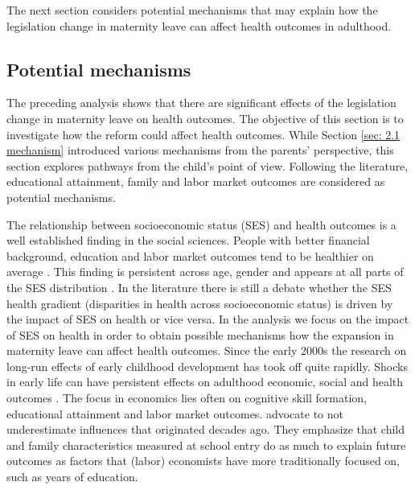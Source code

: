 \documentclass[a4paper ]{article}
\begin{document}
 The next section considers potential mechanisms that may explain how the legislation change in maternity leave can affect health outcomes in adulthood.


\newpage
\subsection{Potential mechanisms}\label{sec: channels}
The preceding analysis shows that there are significant effects of the legislation change in maternity leave on health outcomes. The objective of this section is to investigate how the reform could affect health outcomes. While Section \ref{sec: 2.1 mechanism} introduced various mechanisms from the parents' perspective, this section explores pathways from the child's point of view. Following the literature, educational attainment, family and labor market outcomes are considered as potential mechanisms. \newline 

The relationship between socioeconomic status (SES) and health outcomes is a well established finding in the social sciences. People with better financial background, education and labor market outcomes tend to be healthier on average \citep{currie2003socioeconomic}. This finding is persistent across age, gender and appears at all parts of the SES distribution \citep{Donell}. In the literature there is still a debate whether the SES health gradient (disparities in health across socioeconomic status) is driven by the impact of SES on health or vice versa. In the analysis we focus on the impact of SES on health in order to obtain possible mechanisms how the expansion in maternity leave can affect health outcomes. \newline 
Since the early 2000s the research on long-run effects of early childhood development has took off quite rapidly. Shocks in early life can have persistent effects on adulthood economic, social and health outcomes \citep{heckman2013understanding}. The focus in economics lies often on cognitive skill formation, educational attainment and labor market outcomes. \cite{currie2011human} advocate to not underestimate influences that originated decades ago. They emphasize that child and family characteristics measured at school entry do as much to explain future outcomes as factors that (labor) economists have more traditionally focused on, such as years of education.\newline
\end{document}
